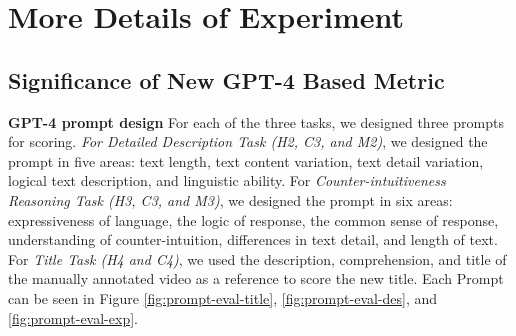 \section{More Details of Experiment} \label{section_c: Experiments}
\subsection{Significance of New GPT-4 Based Metric} \label{appendix_c: Evaluation Metrics}
\noindent\textbf{GPT-4 prompt design}\quad 
For each of the three tasks, we designed three prompts for scoring. \textit{For Detailed Description Task (H2, C3, and M2)}, we designed the prompt in five areas: text length, text content variation, text detail variation, logical text description, and linguistic ability.
For \textit{Counter-intuitiveness Reasoning Task (H3, C3, and M3)}, we designed the prompt in six areas: expressiveness of language, the logic of response, the common sense of response, understanding of counter-intuition, differences in text detail, and length of text.
For \textit{Title Task (H4 and C4)}, we used the description, comprehension, and title of the manually annotated video as a reference to score the new title. Each Prompt can be seen in Figure \ref{fig:prompt-eval-title}, \ref{fig:prompt-eval-des}, and \ref{fig:prompt-eval-exp}.

